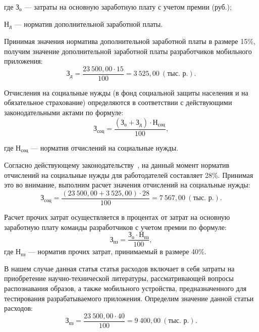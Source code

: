 \noindent где
\( \text{З}_{\text{о}} \)
--- затраты на основную заработную плату с учетом премии (руб.); \par
\noindent \hspace{6.5mm} \( \text{Н}_{\text{д}} \)
--- норматив дополнительной заработной платы.

Принимая значения норматива дополнительной заработной платы в размере 15\%,
получим значение дополнительной заработной платы разработчиков
мобильного приложения:
\begin{equation}
  \text{З}_{\text{д}} =
  \dfrac{23 \: 500{,}00 \cdot 15}{100} = 3 \: 525{,}00 \: (\text{тыс.~р.}).
\end{equation}

Отчисления на социальные нужды (в фонд социальной защиты
населения и на обязательное страхование) определяются в соответствии с
действующими законодательными актами по формуле:
\begin{equation}
  \text{З}_{\text{соц}} =
  \dfrac{(\text{З}_{\text{о}} + \text{З}_{\text{д}}) \cdot \text{Н}_{\text{соц}}}{100},
\end{equation}

\noindent где
\( \text{Н}_{\text{соц}} \)
--- норматив отчислений на социальные нужды.

Согласно действующему законодательству~\cite{law_social_royalties},
на данный момент норматив отчислений на социальные нужды для работодателей
составляет 28\%. Принимая это во внимание, выполним расчет значения
отчислений на социальные нужды:
\begin{equation}
  \text{З}_{\text{соц}} =
  \dfrac{(23 \: 500{,}00 + 3 \: 525{,}00) \cdot 28}{100} = 7 \: 567{,}00 \: (\text{тыс.~р.}).
\end{equation}

Расчет прочих затрат осуществляется в процентах от затрат на основную
заработную плату команды разработчиков с учетом премии по формуле:
\begin{equation}
  \text{З}_{\text{пз}} =
  \dfrac{\text{З}_{\text{о}} \cdot \text{Н}_{\text{пз}}}{100},
\end{equation}
\noindent где
\( \text{Н}_{\text{пз}} \)
--- норматив прочих затрат, принимаемый в размере 40\%.

В нашем случае данная статья статья расходов включает в себя затраты на приобретение
научно-технической литературы, рассматривающей вопросы распознавания образов,
а также мобильного устройства, предназначенного
для тестирования разрабатываемого приложения.
Определим значение данной статьи расходов:
\begin{equation}
  \text{З}_{\text{пз}} =
  \dfrac{23 \: 500{,}00 \cdot 40}{100} = 9 \: 400{,}00 \: (\text{тыс.~р.}).
\end{equation}

